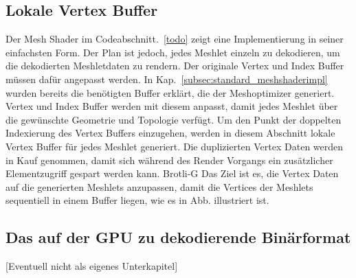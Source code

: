 \subsection{Lokale Vertex Buffer}
\label{subsec:local_vertex_buffers}
Der Mesh Shader im Codeabschnitt.~\ref{todo} zeigt eine Implementierung in seiner einfachsten Form.
Der Plan ist jedoch, jedes Meshlet einzeln zu dekodieren, um die dekodierten Meshletdaten zu rendern.
Der originale Vertex und Index Buffer müssen dafür angepasst werden.
In Kap.~\ref{subsec:standard_meshshaderimpl} wurden bereits die benötigten Buffer erklärt, die der Meshoptimizer generiert.
Vertex und Index Buffer werden mit diesem anpasst, damit jedes Meshlet über die gewünschte Geometrie und Topologie verfügt. \newline
Um den Punkt der doppelten Indexierung des Vertex Buffers einzugehen, werden in diesem Abschnitt lokale Vertex Buffer für jedes Meshlet generiert.
Die duplizierten Vertex Daten werden in Kauf genommen, damit sich während des Render Vorgangs ein zusätzlicher Elementzugriff gespart werden kann.
Brotli-G
\newline
Das Ziel ist es, die Vertex Daten auf die generierten Meshlets anzupassen, damit die Vertices der Meshlets sequentiell in einem Buffer liegen, wie es in Abb. illustriert ist.




\subsection{Das auf der GPU zu dekodierende Binärformat}
\label{subsec:binary_format}
[Eventuell nicht als eigenes Unterkapitel]
